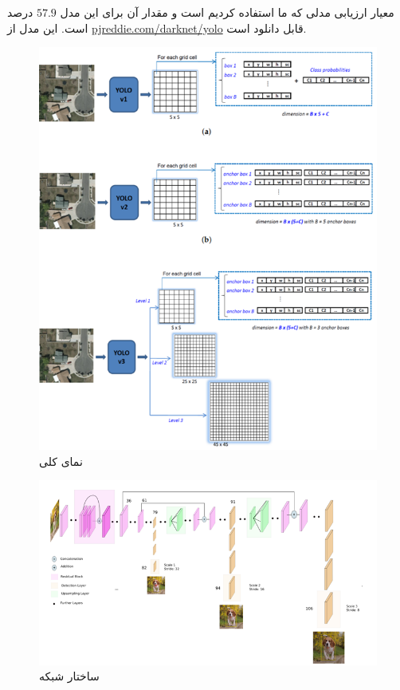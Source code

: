 \documentclass[12pt,a4paper]{report}
\begin{document}
معیار ارزیابی مدلی که ما استفاده کردیم
است و مقدار آن برای این مدل $57.9$ درصد است.
این مدل از
\href{https://pjreddie.com/darknet/yolo}{pjreddie.com/darknet/yolo}
قابل دانلود است.
\begin{figure}
  \centering
  \includegraphics[width=\textwidth]{Images//yolo2.png}
  \caption{نمای کلی }\label{yolo2}
\end{figure}
\begin{figure}
  \centering
  \includegraphics[width=\textwidth]{Images//yolo3.png}
  \caption{ساختار شبکه }\label{yolo3}
\end{figure}
\end{document}
